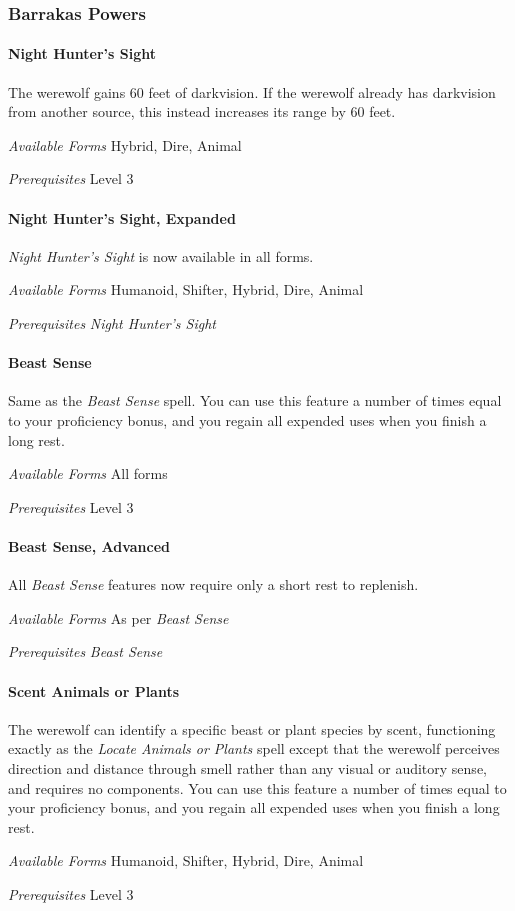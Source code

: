 \documentclass[twocolumn]{dndbook}
\begin{document}
\subsubsection{Barrakas Powers}

\paragraph*{Night Hunter's Sight}
The werewolf gains 60 feet of darkvision. If the werewolf already has darkvision from another source, this instead increases its range by 60 feet.\par
\emph{Available Forms} Hybrid, Dire, Animal\par
\emph{Prerequisites} Level 3\par

\paragraph*{Night Hunter's Sight, Expanded}
\emph{Night Hunter's Sight} is now available in all forms.\par
\emph{Available Forms} Humanoid, Shifter, Hybrid, Dire, Animal\par
\emph{Prerequisites} \emph{Night Hunter's Sight}\par

\paragraph*{Beast Sense}
Same as the \emph{Beast Sense} spell.
You can use this feature a number of times equal to your proficiency bonus, and you regain all expended uses when you finish a long rest.\par
\emph{Available Forms} All forms\par
\emph{Prerequisites} Level 3\par


\paragraph*{Beast Sense, Advanced}
All \emph{Beast Sense} features now require only a short rest to replenish.\par
\emph{Available Forms} As per \emph{Beast Sense} \par
\emph{Prerequisites} \emph{Beast Sense}\par

\paragraph*{Scent Animals or Plants}
The werewolf can identify a specific beast or plant species by scent, functioning exactly as the \emph{Locate Animals or Plants} spell except that the werewolf perceives direction and distance through smell rather than any visual or auditory sense, and requires no components.
You can use this feature a number of times equal to your proficiency bonus, and you regain all expended uses when you finish a long rest.\par
\emph{Available Forms} Humanoid, Shifter, Hybrid, Dire, Animal\par
\emph{Prerequisites} Level 3\par
\end{document}
